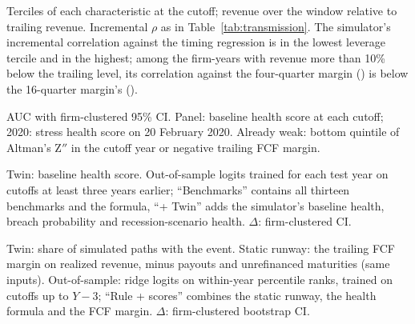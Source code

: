 \begin{table}[!htbp]
\centering\scriptsize
\caption{Transmission by firm characteristics and by revenue shock}
\label{tab:heterogeneity}

\par\smallskip
\begin{minipage}{\linewidth}\footnotesize
Terciles of each characteristic at the cutoff; revenue over the window relative to trailing revenue. Incremental $\rho$ as in Table~\ref{tab:transmission}. The simulator's incremental correlation against the timing regression is \HetLevLowTwinReg{} in the lowest leverage tercile and \HetLevHighTwinReg{} in the highest; among the \HetDownN{} firm-years with revenue more than 10\% below the trailing level, its correlation against the four-quarter margin (\HetDownTwin) is below the 16-quarter margin's (\HetDownSixteen).
\end{minipage}
\end{table}

\begin{table}[!htbp]
\centering\scriptsize
\caption{Bankruptcy petitions (8-K Item 1.03), all non-financial US-GAAP filers}
\label{tab:bankruptcy}

\par\smallskip
\begin{minipage}{\linewidth}\footnotesize
AUC with firm-clustered 95\% CI. Panel: baseline health score at each cutoff; 2020: stress health score on 20 February 2020. Already weak: bottom quintile of Altman's Z$''$ in the cutoff year or negative trailing FCF margin.
\end{minipage}
\end{table}

\begin{table}[!htbp]
\centering\scriptsize
\caption{Distress events over the next eight quarters, 2014--2024}
\label{tab:panel}

\par\smallskip
\begin{minipage}{\linewidth}\footnotesize
Twin: baseline health score. Out-of-sample logits trained for each test year on cutoffs at least three years earlier; ``Benchmarks'' contains all thirteen benchmarks and the formula, ``+ Twin'' adds the simulator's baseline health, breach probability and recession-scenario health. $\Delta$: firm-clustered CI.
\end{minipage}
\end{table}

\begin{table}[!htbp]
\centering\scriptsize
\caption{Liquidity events given the realized revenue}
\label{tab:decisions}

\par\smallskip
\begin{minipage}{\linewidth}\footnotesize
Twin: share of simulated paths with the event. Static runway: the trailing FCF margin on realized revenue, minus payouts and unrefinanced maturities (same inputs). Out-of-sample: ridge logits on within-year percentile ranks, trained on cutoffs up to $Y-3$; ``Rule + scores'' combines the static runway, the health formula and the FCF margin. $\Delta$: firm-clustered bootstrap CI.
\end{minipage}
\end{table}

